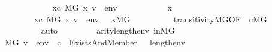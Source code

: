 \begin{isabellebody}
\ \ \ \ \isamarkupfalse%
\isanewline
\ \ \ \ \ \ \isamarkupfalse%
\ {\isachardoublequoteopen}{\isasymexists}x{\isasymin}c{\isachardot}{\kern0pt}\ M{\isacharbrackleft}{\kern0pt}G{\isacharbrackright}{\kern0pt}{\isacharcomma}{\kern0pt}\ {\isacharbrackleft}{\kern0pt}x{\isacharcomma}{\kern0pt}\ v{\isacharbrackright}{\kern0pt}\ {\isacharat}{\kern0pt}\ env\ {\isasymTurnstile}\ {\isasymphi}{\isachardoublequoteclose}\isanewline
\ \ \ \ \ \ \isamarkupfalse%
\ \isamarkupfalse%
\ x\ \isanewline
\ \ \ \ \ \ \ \ {\isachardoublequoteopen}x{\isasymin}c{\isachardoublequoteclose}\ {\isachardoublequoteopen}M{\isacharbrackleft}{\kern0pt}G{\isacharbrackright}{\kern0pt}{\isacharcomma}{\kern0pt}\ {\isacharbrackleft}{\kern0pt}x{\isacharcomma}{\kern0pt}\ v{\isacharbrackright}{\kern0pt}\ {\isacharat}{\kern0pt}\ env\ {\isasymTurnstile}\ {\isasymphi}{\isachardoublequoteclose}\ {\isachardoublequoteopen}x{\isasymin}M{\isacharbrackleft}{\kern0pt}G{\isacharbrackright}{\kern0pt}{\isachardoublequoteclose}\isanewline
\ \ \ \ \ \ \ \ \isamarkupfalse%
\ transitivity{\isacharunderscore}{\kern0pt}MG{\isacharbrackleft}{\kern0pt}OF\ {\isacharunderscore}{\kern0pt}\ {\isacartoucheopen}c{\isasymin}M{\isacharbrackleft}{\kern0pt}G{\isacharbrackright}{\kern0pt}{\isacartoucheclose}{\isacharbrackright}{\kern0pt}\isanewline
\ \ \ \ \ \ \ \ \isamarkupfalse%
\ auto\isanewline
\ \ \ \ \ \ \isamarkupfalse%
\ {\isacartoucheopen}{\isasymphi}{\isasymin}{\isacharunderscore}{\kern0pt}{\isacartoucheclose}\ {\isacartoucheopen}arity{\isacharparenleft}{\kern0pt}{\isasymphi}{\isacharparenright}{\kern0pt}{\isasymle}{}{\isacharhash}{\kern0pt}{\isacharplus}{\kern0pt}length{\isacharparenleft}{\kern0pt}env{\isacharparenright}{\kern0pt}{\isacartoucheclose}\ inMG\isanewline
\ \ \ \ \ \ \isamarkupfalse%
\ {\isachardoublequoteopen}M{\isacharbrackleft}{\kern0pt}G{\isacharbrackright}{\kern0pt}{\isacharcomma}{\kern0pt}\ {\isacharbrackleft}{\kern0pt}v{\isacharbrackright}{\kern0pt}\ {\isacharat}{\kern0pt}\ env\ {\isacharat}{\kern0pt}\ {\isacharbrackleft}{\kern0pt}c{\isacharbrackright}{\kern0pt}\ {\isasymTurnstile}\ Exists{\isacharparenleft}{\kern0pt}And{\isacharparenleft}{\kern0pt}Member{\isacharparenleft}{\kern0pt}{}{\isacharcomma}{\kern0pt}\ {}\ {\isacharhash}{\kern0pt}{\isacharplus}{\kern0pt}\ length{\isacharparenleft}{\kern0pt}env{\isacharparenright}{\kern0pt}{\isacharparenright}{\kern0pt}{\isacharcomma}{\kern0pt}\ {\isasymphi}{\isacharparenright}{\kern0pt}{\isacharparenright}{\kern0pt}{\isachardoublequoteclose}\isanewline

\end{isabellebody}
